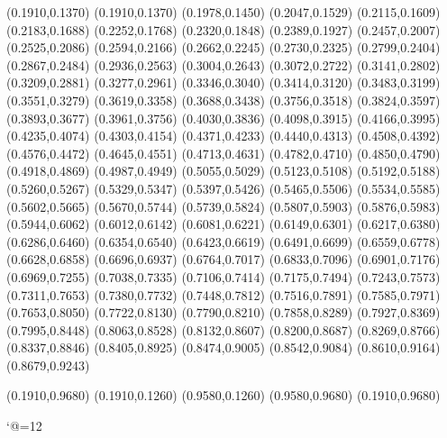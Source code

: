\PST@Dotted(0.1910,0.1370)
(0.1910,0.1370)
(0.1978,0.1450)
(0.2047,0.1529)
(0.2115,0.1609)
(0.2183,0.1688)
(0.2252,0.1768)
(0.2320,0.1848)
(0.2389,0.1927)
(0.2457,0.2007)
(0.2525,0.2086)
(0.2594,0.2166)
(0.2662,0.2245)
(0.2730,0.2325)
(0.2799,0.2404)
(0.2867,0.2484)
(0.2936,0.2563)
(0.3004,0.2643)
(0.3072,0.2722)
(0.3141,0.2802)
(0.3209,0.2881)
(0.3277,0.2961)
(0.3346,0.3040)
(0.3414,0.3120)
(0.3483,0.3199)
(0.3551,0.3279)
(0.3619,0.3358)
(0.3688,0.3438)
(0.3756,0.3518)
(0.3824,0.3597)
(0.3893,0.3677)
(0.3961,0.3756)
(0.4030,0.3836)
(0.4098,0.3915)
(0.4166,0.3995)
(0.4235,0.4074)
(0.4303,0.4154)
(0.4371,0.4233)
(0.4440,0.4313)
(0.4508,0.4392)
(0.4576,0.4472)
(0.4645,0.4551)
(0.4713,0.4631)
(0.4782,0.4710)
(0.4850,0.4790)
(0.4918,0.4869)
(0.4987,0.4949)
(0.5055,0.5029)
(0.5123,0.5108)
(0.5192,0.5188)
(0.5260,0.5267)
(0.5329,0.5347)
(0.5397,0.5426)
(0.5465,0.5506)
(0.5534,0.5585)
(0.5602,0.5665)
(0.5670,0.5744)
(0.5739,0.5824)
(0.5807,0.5903)
(0.5876,0.5983)
(0.5944,0.6062)
(0.6012,0.6142)
(0.6081,0.6221)
(0.6149,0.6301)
(0.6217,0.6380)
(0.6286,0.6460)
(0.6354,0.6540)
(0.6423,0.6619)
(0.6491,0.6699)
(0.6559,0.6778)
(0.6628,0.6858)
(0.6696,0.6937)
(0.6764,0.7017)
(0.6833,0.7096)
(0.6901,0.7176)
(0.6969,0.7255)
(0.7038,0.7335)
(0.7106,0.7414)
(0.7175,0.7494)
(0.7243,0.7573)
(0.7311,0.7653)
(0.7380,0.7732)
(0.7448,0.7812)
(0.7516,0.7891)
(0.7585,0.7971)
(0.7653,0.8050)
(0.7722,0.8130)
(0.7790,0.8210)
(0.7858,0.8289)
(0.7927,0.8369)
(0.7995,0.8448)
(0.8063,0.8528)
(0.8132,0.8607)
(0.8200,0.8687)
(0.8269,0.8766)
(0.8337,0.8846)
(0.8405,0.8925)
(0.8474,0.9005)
(0.8542,0.9084)
(0.8610,0.9164)
(0.8679,0.9243)

\PST@Border(0.1910,0.9680)
(0.1910,0.1260)
(0.9580,0.1260)
(0.9580,0.9680)
(0.1910,0.9680)

\catcode`@=12
\fi
\endpspicture

